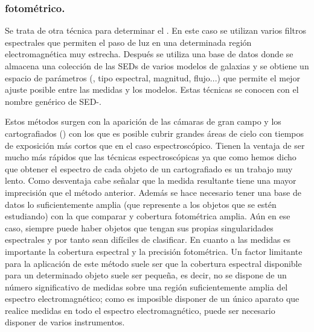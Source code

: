 \subsubsection{ fotométrico.}

Se trata de otra técnica para determinar el \rt. En este caso se utilizan varios filtros espectrales que permiten el paso de luz en una determinada región electromagnética muy estrecha. Después se utiliza una base de datos donde se almacena una colección de las SEDs de varios modelos de galaxias y se obtiene un espacio de parámetros (\rt, tipo espectral, magnitud, flujo...) que permite el mejor ajuste posible entre las medidas y los modelos. Estas técnicas se conocen con el nombre genérico de SED-. 

Estos métodos surgen con la aparición de las cámaras de gran campo y los cartografiados () con los que es posible cubrir grandes áreas de cielo con tiempos de exposición más cortos que en el caso espectroscópico. Tienen la ventaja de ser mucho más rápidos que las técnicas espectroscópicas ya que como hemos dicho que obtener el espectro de cada objeto de un cartografiado es un trabajo muy lento. Como desventaja cabe señalar que la medida resultante tiene una mayor imprecisión que el método anterior. Además se hace necesario tener una base de datos lo suficientemente amplia (que represente a los objetos que se estén estudiando) con la que comparar y cobertura fotométrica amplia. Aún en ese caso, siempre puede haber objetos que tengan sus propias singularidades espectrales y por tanto sean difíciles de clasificar. En cuanto a las medidas es importante la cobertura espectral y la precisión fotométrica.
Un factor limitante para la aplicación de este método suele ser que la cobertura espectral disponible para un determinado objeto suele ser pequeña, es decir, no se dispone de un número significativo de medidas sobre una región suficientemente amplia del espectro electromagnético; como es imposible disponer de un único aparato que realice medidas en todo el espectro electromagnético, puede ser necesario disponer de varios instrumentos. 

